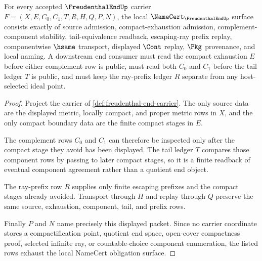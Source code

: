 \begin{theorem}
\label{thm:freudenthal-end-namecert-obligation-surface}
For every accepted $\FreudenthalEndUp$ carrier $F=(X,E,C_0,C_1,T,R,H,Q,P,N)$, the local $\NameCert_{\FreudenthalEndUp}$ surface consists exactly of source admission, compact-exhaustion admission, complement-component stability, tail-equivalence readback, escaping-ray prefix replay, componentwise $\hsame$ transport, displayed $\Cont$ replay, $\Pkg$ provenance, and local naming. A downstream end consumer must read the compact exhaustion $E$ before either complement row is public, must read both $C_0$ and $C_1$ before the tail ledger $T$ is public, and must keep the ray-prefix ledger $R$ separate from any host-selected ideal point.
\end{theorem}
\begin{proof}
Project the carrier of \autoref{def:freudenthal-end-carrier}. The only source data are the displayed metric, locally compact, and proper metric rows in $X$, and the only compact boundary data are the finite compact stages in $E$.

The complement rows $C_0$ and $C_1$ can therefore be inspected only after the compact stage they avoid has been displayed. The tail ledger $T$ compares those component rows by passing to later compact stages, so it is a finite readback of eventual component agreement rather than a quotient end object.

The ray-prefix row $R$ supplies only finite escaping prefixes and the compact stages already avoided. Transport through $H$ and replay through $Q$ preserve the same source, exhaustion, component, tail, and prefix rows.

Finally $P$ and $N$ name precisely this displayed packet. Since no carrier coordinate stores a compactification point, quotient end space, open-cover compactness proof, selected infinite ray, or countable-choice component enumeration, the listed rows exhaust the local NameCert obligation surface.
\end{proof}


